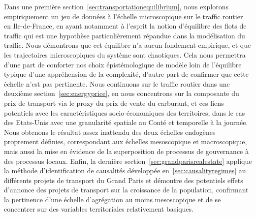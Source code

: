 Dans une première section~\ref{sec:transportationequilibrium}, nous explorons empiriquement un jeu de données à l'échelle microscopique sur le traffic routier en Ile-de-France, en ayant notamment à l'esprit la notion d'équilibre des flots de traffic qui est une hypothèse particulièrement répandue dans la modélisation du traffic. Nous démontrons que cet équilibre n'a aucun fondement empirique, et que les trajectoires microscopiques du système sont chaotiques. Cela nous permettra d'une part de conforter nos choix épistémologique de modèle loin de l'équilibre typique d'une appréhension de la complexité, d'autre part de confirmer que cette échelle n'est pas pertinente. Nous continuons sur le traffic routier dans une deuxième section~\ref{sec:energyprice}, en nous concentrons sur la composante du prix de transport via le proxy du prix de vente du carburant, et ces liens potentiels avec les caractéristiques socio-économiques des territoires, dans le cas des Etats-Unis avec une granularité spatiale au Conté et temporelle à la journée. Nous obtenons le résultat assez inattendu des deux échelles endogènes proprement définies, correspondant aux échelles mesoscopique et macroscopique, mais aussi la mise en évidence de la superposition de processus de gouvernance à des processus locaux. Enfin, la dernière section~\ref{sec:grandparisrealestate} applique la méthode d'identification de causalités développée en~\ref{sec:causalityregimes} au différents projets de transport du Grand Paris et démontre des potentiels effets d'annonce des projets de transport sur la croissance de la population, confirmant la pertinence d'une échelle d'agrégation au moins mesoscopique et de se concentrer sur des variables territoriales relativement basiques.



\stars














